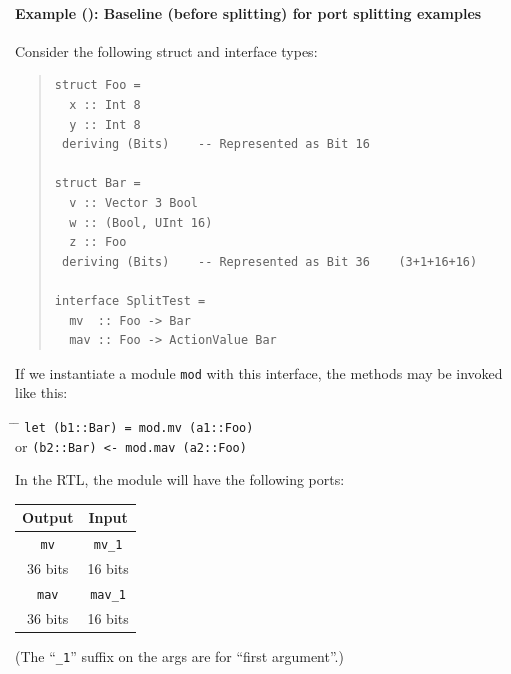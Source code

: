 
\paragraph{Example ({\BHb}): Baseline (before splitting) for port splitting examples}

\label{sec:splitports_examples_BH_baseline}

\hspace*{1em}

Consider the following struct and interface types:
\begin{quote}
\begin{verbatim}
struct Foo =
  x :: Int 8
  y :: Int 8
 deriving (Bits)    -- Represented as Bit 16

struct Bar =
  v :: Vector 3 Bool
  w :: (Bool, UInt 16)
  z :: Foo
 deriving (Bits)    -- Represented as Bit 36    (3+1+16+16)

interface SplitTest =
  mv  :: Foo -> Bar
  mav :: Foo -> ActionValue Bar
\end{verbatim}
\end{quote}

If we instantiate a module {\tt mod} with this interface, the methods
may be invoked like this:

\begin{tabbing}
\hspace*{4em} \= \hspace*{2em} \= \kill
\hspace*{4em} \>               \> {\tt let (b1::Bar)  = mod.mv  (a1::Foo)} \\
              \>  or           \> {\tt     (b2::Bar) <- mod.mav (a2::Foo)}
\end{tabbing}

In the RTL, the module will have the following ports:

\begin{center}
  \begin{tabular}{|c||c|}
    \hline
     Output &
     Input  \\
    \hline
     {\tt mv}    &
     {\tt mv\_1} \\
     36 bits &
     16 bits \\
    \hline
     {\tt mav}    &
     {\tt mav\_1} \\
     36 bits &
     16 bits \\
    \hline
\end{tabular}

{\footnotesize (The ``{\tt \_1}'' suffix on the args are for ``first argument''.)}
\end{center}

